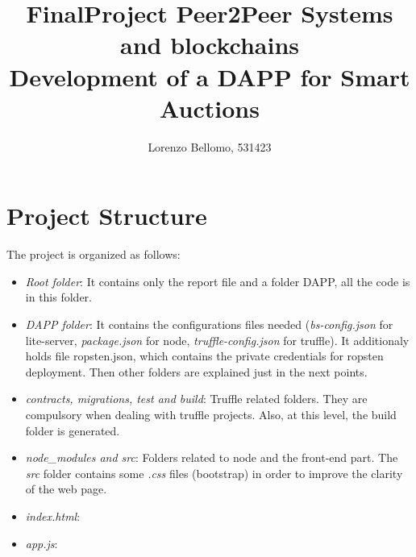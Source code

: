 \documentclass[11pt, a4paper]{report}
\title{
	FinalProject Peer2Peer Systems and blockchains \\
	\large Development of a DAPP for Smart Auctions}
\author{Lorenzo Bellomo, 531423}
\date{}
\begin{document}
	\maketitle
	
\section*{Project Structure}
The project is organized as follows:
\begin{itemize}
	\item \emph{Root folder}: It contains only the report file and a folder DAPP, all the code is in this folder.
	\item \emph{DAPP folder}: It contains the configurations files needed (\emph{bs-config.json} for lite-server, \emph{package.json} for node, \emph{truffle-config.json} for truffle). It additionaly holds file ropsten.json, which contains the private credentials for ropsten deployment. Then other folders are explained just in the next points.
	\item \emph{contracts, migrations, test and build}: Truffle related folders. They are compulsory when dealing with truffle projects. Also, at this level, the build folder is generated.
	\item \emph{node\_modules and src}: Folders related to node and the front-end part. The \emph{src} folder contains some \emph{.css} files (bootstrap) in order to improve the clarity of the web page. 
	\item \emph{index.html}:
	\item \emph{app.js}:
\end{itemize}
\end{document}

